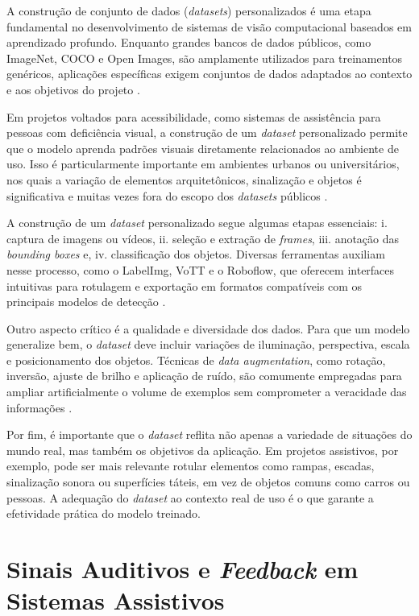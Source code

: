 A construção de conjunto de dados (\textit{datasets}) personalizados é uma etapa fundamental no desenvolvimento de sistemas de visão computacional baseados em aprendizado profundo. Enquanto grandes bancos de dados públicos, como ImageNet, COCO e Open Images, são amplamente utilizados para treinamentos genéricos, aplicações específicas exigem conjuntos de dados adaptados ao contexto e aos objetivos do projeto \cite{Zhou2017}.

Em projetos voltados para acessibilidade, como sistemas de assistência para pessoas com deficiência visual, a construção de um \textit{dataset} personalizado permite que o modelo aprenda padrões visuais diretamente relacionados ao ambiente de uso. Isso é particularmente importante em ambientes urbanos ou universitários, nos quais a variação de elementos arquitetônicos, sinalização e objetos é significativa e muitas vezes fora do escopo dos \textit{datasets} públicos \cite{Khan2021}.

A construção de um \textit{dataset} personalizado segue algumas etapas essenciais: i. captura de imagens ou vídeos, ii. seleção e extração de \textit{frames}, iii. anotação das \textit{bounding boxes} e, iv. classificação dos objetos. Diversas ferramentas auxiliam nesse processo, como o LabelImg, VoTT e o Roboflow, que oferecem interfaces intuitivas para rotulagem e exportação em formatos compatíveis com os principais modelos de detecção \cite{Tzutalin2015}.

Outro aspecto crítico é a qualidade e diversidade dos dados. Para que um modelo generalize bem, o \textit{dataset} deve incluir variações de iluminação, perspectiva, escala e posicionamento dos objetos. Técnicas de \textit{data augmentation}, como rotação, inversão, ajuste de brilho e aplicação de ruído, são comumente empregadas para ampliar artificialmente o volume de exemplos sem comprometer a veracidade das informações \cite{Shorten2019}.

Por fim, é importante que o \textit{dataset} reflita não apenas a variedade de situações do mundo real, mas também os objetivos da aplicação. Em projetos assistivos, por exemplo, pode ser mais relevante rotular elementos como rampas, escadas, sinalização sonora ou superfícies táteis, em vez de objetos comuns como carros ou pessoas. A adequação do \textit{dataset} ao contexto real de uso é o que garante a efetividade prática do modelo treinado.

\section{Sinais Auditivos e \textit{Feedback} em Sistemas Assistivos}

